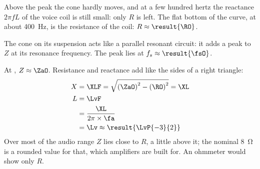 \begin{abcliste}
\abc Above the peak the cone hardly moves, and at a few hundred hertz the reactance $2\pi f L$ of the voice coil is still small: only $R$ is left. The flat bottom of the curve, at about \SI{400}{\hertz}, is the resistance of the coil: $R \approx \result{\RO}$.

\abc The cone on its suspension acts like a parallel resonant circuit: it adds a peak to $Z$ at its resonance frequency. The peak lies at $f_s \approx \result{\fsO}$.

\abc At \faO, $Z \approx \ZaO$. Resistance and reactance add like the sides of a right triangle:
\begin{align}
 X &= \XLF = \sqrt{\left(\ZaO\right)^2 - \left(\RO\right)^2} = \XL \\
 L &= \LvF \\
   &= \frac{\XL}{2\pi\times\fa} \\
   &= \Lv \approx \result{\LvP{-3}{2}}
\end{align}
Over most of the audio range $Z$ lies close to $R$, a little above it; the nominal \SI{8}{\ohm} is a rounded value for that, which amplifiers are built for. An ohmmeter would show only $R$.
\end{abcliste}
